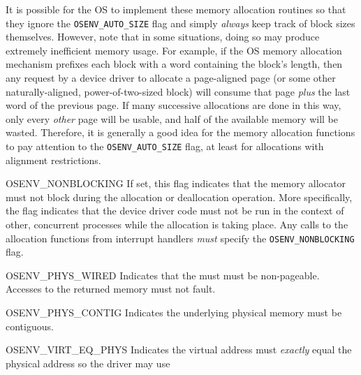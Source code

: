 \begin{apidesc}
\begin{icsymlist}
		It is possible for the OS
		to implement these memory allocation routines
		so that they ignore the {\tt OSENV_AUTO_SIZE} flag
		and simply \emph{always} keep track of block sizes themselves.
		However, note that in some situations,
		doing so may produce extremely inefficient memory usage.
		For example, if the OS memory allocation mechanism
		prefixes each block with a word containing the block's length,
		then any request by a device driver
		to allocate a page-aligned page
		(or some other naturally-aligned, power-of-two-sized block)
		will consume that page
		\emph{plus} the last word of the previous page.
		If many successive allocations are done in this way,
		only every \emph{other} page will be usable,
		and half of the available memory will be wasted.
		Therefore, it is generally a good idea
		for the memory allocation functions
		to pay attention to the {\tt OSENV_AUTO_SIZE} flag,
		at least for allocations with alignment restrictions.
	\item[OSENV_NONBLOCKING]
		If set,
		this flag indicates that the memory allocator
		must not block during the allocation or deallocation operation.
		More specifically, the flag indicates
		that the device driver code must not be run
		in the context of other, concurrent processes
		while the allocation is taking place.
		Any calls to the allocation functions from interrupt handlers
		\emph{must} specify the {\tt OSENV_NONBLOCKING} flag.
	\item[OSENV_PHYS_WIRED]
		Indicates that the must must be non-pageable.
		Accesses to the returned memory must not fault.
	\item[OSENV_PHYS_CONTIG]
		Indicates the underlying physical memory
		must be contiguous.
	\item[OSENV_VIRT_EQ_PHYS]
		Indicates the virtual address must \emph{exactly}
		equal the physical address so the driver may use

\end{icsymlist}
\end{apidesc}
